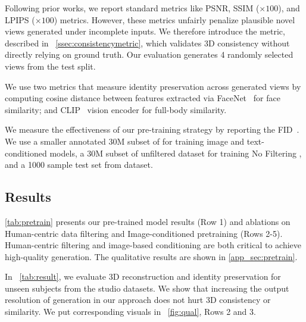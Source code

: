 Following prior works, we report standard metrics like PSNR, SSIM ($\times 100$), and LPIPS ($\times 100$) metrics. However, these metrics unfairly penalize plausible novel views generated under incomplete inputs. We therefore introduce the \reprojectionerror metric, described in ~\cref{ssec:consistencymetric}, which validates 3D consistency without directly relying on ground truth. Our evaluation generates 4 randomly selected views from the test split.

\vspace{1mm}
 We use two metrics that measure identity preservation across generated views by computing cosine distance between features extracted via FaceNet~\cite{schroff2015facenet, vggface} for face similarity; and CLIP~\cite{radford2021learning} vision encoder for full-body similarity.

\vspace{1mm}
 We measure the effectiveness of our pre-training strategy by reporting the 
FID~\cite{FID}. We use a smaller annotated 30M subset of \ig for training image and text-conditioned  models, 
a 30M subset of unfiltered dataset for training No Filtering , and a 1000 sample test set from \mobile dataset.






\subsection{Results} \label{ssec:results}


 \cref{tab:pretrain} presents our pre-trained model results (Row 1) and ablations on Human-centric data filtering and Image-conditioned pretraining (Rows 2-5). Human-centric filtering and image-based conditioning are both critical to achieve high-quality generation.
The qualitative results are shown in \cref{app_sec:pretrain}.








\vspace{1mm}
 In ~\cref{tab:result}, we evaluate 3D reconstruction and identity preservation for unseen subjects from the studio datasets. 
We show that increasing the output resolution of generation in our approach does not hurt 3D consistency or similarity. 
We put corresponding visuals in ~\cref{fig:qual}, Rows 2 and 3.




